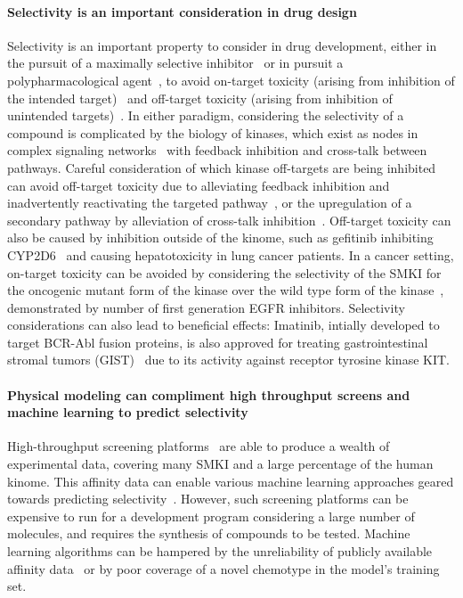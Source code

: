 \documentclass[9pt,lineno]{elife-modified} %
\begin{document}
\paragraph{Selectivity is an important consideration in drug design}
Selectivity is an important property to consider in drug development, either in the pursuit of a maximally selective inhibitor~\citep{Zhang2009-il,Huggins2012-hr} or in pursuit a polypharmacological agent~\citep{Fan2007-hm,Apsel2008-it,Knight:Nat.Rev.Cancer:2010,Hopkins2006-qu,Hopkins2008-ij}, to avoid on-target toxicity (arising from inhibition of the intended target)~\citep{Rudmann2013-hi}  and off-target toxicity (arising from inhibition of unintended targets)~\citep{Kijima2011-xs,Liu2014-yi}. In either paradigm, considering the selectivity of a compound is complicated by the biology of kinases, which exist as nodes in complex signaling networks~\citep{Mendoza2011-bj,Tricker2015-xx} with feedback inhibition and cross-talk between pathways. Careful consideration of which kinase off-targets are being inhibited can avoid off-target toxicity due to alleviating feedback inhibition and inadvertently reactivating the targeted pathway~\citep{Mendoza2011-bj,Tricker2015-xx}, or the upregulation of a secondary pathway by alleviation of cross-talk inhibition~\citep{Bailey2014-pd,Chandarlapaty:CancerCell:2011}. Off-target toxicity can also be caused by inhibition outside of the kinome, such as gefitinib inhibiting CYP2D6~\citep{Kijima2011-xs} and causing hepatotoxicity in lung cancer patients. In a cancer setting, on-target toxicity can be avoided by considering the selectivity of the SMKI for the oncogenic mutant form of the kinase over the wild type form of the kinase~\citep{Pao2004-kx,Kim2012-mo,Juchum:DrugResist.Updat.:2015}, demonstrated by number of first generation EGFR inhibitors. Selectivity considerations can also lead to beneficial effects: Imatinib, intially developed to target BCR-Abl fusion proteins, is also approved for treating gastrointestinal stromal tumors (GIST)~\citep{Din2008-ag} due to its activity against receptor tyrosine kinase KIT. 

\paragraph{Physical modeling can compliment high throughput screens and machine learning to predict selectivity}
High-throughput screening platforms~\citep{Davis:Nat.Biotechnol.:2011,Drewry2017-bd,Cheng2010-ip,Uitdehaag2012-nm,Klaeger2017-jr} are able to produce a wealth of experimental data, covering many SMKI and a large percentage of the human kinome. This affinity data can enable various machine learning approaches geared towards predicting selectivity~\citep{Merget2017-sv,Volkamer2016-sj}. However, such screening platforms can be expensive to run for a development program considering a large number of molecules, and requires the synthesis of compounds to be tested. Machine learning algorithms can be hampered by the unreliability of publicly available affinity data~\citep{Kramer:J.Med.Chem.:2012} or by poor coverage of a novel chemotype in the model's training set. 
\end{document}
